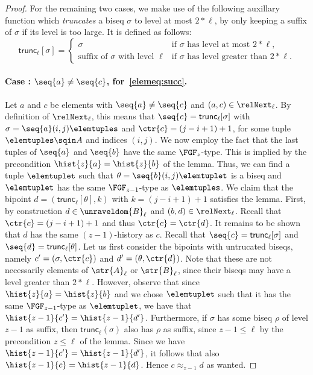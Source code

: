 \begin{proof}
  For the remaining two cases, we make use of the following auxillary function which \emph{truncates} a biseq $\sigma$ to level at most $2 * \ell$, by only keeping a suffix of $\sigma$ if its level is too large.
  It is defined as follows:
  \begin{displaymath}
    \mathsf{trunc}_{\ell}[\sigma] =
    \begin{cases}
      \sigma & \text{if $\sigma$ has level at most $2 * \ell$,} \\
      \text{suffix of $\sigma$ with level $\ell$} & \text{if $\sigma$ has level greater than $2 * \ell$.}
    \end{cases}
  \end{displaymath}

  \paragraph{Case : $\seq{a} \ne \seq{c}$, for~\ref{elemeq:succ}.}
  Let $a$ and $c$ be elements with $\seq{a} \ne \seq{c}$ and $(a,c) \in \relNext_{\ell}$.
  By definition of $\relNext_{\ell}$, this means that $\seq{c} = \mathsf{trunc}_{\ell}[\sigma]$ with $\sigma = \seq{a}(i,j)\elemtuples$ and $\ctr{c} = (j-i+1)+1$, for some tuple $\elemtuples \sqin A$ and indices $(i,j)$.
  We now employ the fact that the last tuples of $\seq{a}$ and $\seq{b}$ have the same $\FGF_{z}$-type.
  This is implied by the precondition $\hist{z}{a} = \hist{z}{b}$ of the lemma.
  Thus, we can find a tuple $\elemtuplet$ such that $\theta = \seq{b} (i,j) \elemtuplet$ is a biseq and $\elemtuplet$ has the same $\FGF_{z{-}1}$-type as $\elemtuples$.
  We claim that the bipoint $d = (\mathsf{trunc}_{\ell}[\theta], k)$ with $k = (j-i+1)+1$ satisfies the lemma.
  First, by construction $d \in \unraveldom{B}_{\ell}$ and $(b,d) \in \relNext_{\ell}$.
  Recall that $\ctr{c} = (j-i+1)+1$ and thus $\ctr{c} = \ctr{d}$.
  It remains to be shown that $d$ has the same $(z-1)$-history as $c$.
  Recall that $\seq{c} = \mathsf{trunc}_{\ell}[\sigma]$ and $\seq{d} = \mathsf{trunc}_{\ell}[\theta]$.
  Let us first consider the bipoints with untrucated biseqs, namely $c' = (\sigma, \ctr{c})$ and $d' = (\theta, \ctr{d})$.
  Note that these are not necessarily elements of $\str{A}_{\ell}$ or $\str{B}_{\ell}$, since their biseqs may have a level greater than $2 * \ell$.
  However, observe that since $\hist{z}{a} = \hist{z}{b}$ and we chose $\elemtuplet$ such that it has the same $\FGF_{z-1}$-type as $\elemtuplet$, we have that $\hist{z-1}{c'} = \hist{z-1}{d'}$.
  Furthermore, if $\sigma$ has some biseq $\rho$ of level $z-1$ as suffix, then $\mathsf{trunc}_{\ell}(\sigma)$ also has $\rho$ as suffix, since $z-1 \le \ell$ by the precondition $z \le \ell$ of the lemma.
  Since we have $\hist{z-1}{c'} = \hist{z-1}{d'}$, it follows that also $\hist{z-1}{c} = \hist{z-1}{d}$.
  Hence $c \approx_{z-1} d$ as wanted.


\end{proof}

